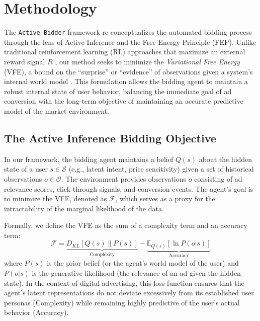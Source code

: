 \section{Methodology}

The \texttt{Active-Bidder} framework re-conceptualizes the automated bidding process through the lens of Active Inference and the Free Energy Principle (FEP). Unlike traditional reinforcement learning (RL) approaches that maximize an external reward signal $R$ \citep{sutton2018reinforcement}, our method seeks to minimize the \textit{Variational Free Energy} (VFE), a bound on the ``surprise'' or ``evidence'' of observations given a system's internal world model \citep{friston2010free}. This formulation allows the bidding agent to maintain a robust internal state of user behavior, balancing the immediate goal of ad conversion with the long-term objective of maintaining an accurate predictive model of the market environment.

\subsection{The Active Inference Bidding Objective}

In our framework, the bidding agent maintains a belief $Q(s)$ about the hidden state of a user $s \in \mathcal{S}$ (e.g., latent intent, price sensitivity) given a set of historical observations $o \in \mathcal{O}$. The environment provides observations $o$ consisting of ad relevance scores, click-through signals, and conversion events. The agent's goal is to minimize the VFE, denoted as $\mathcal{F}$, which serves as a proxy for the intractability of the marginal likelihood of the data.

Formally, we define the VFE as the sum of a complexity term and an accuracy term:
\begin{equation}
\mathcal{F} = \underbrace{D_{KL}\left[Q(s) \parallel P(s)\right]}_{\text{Complexity}} - \underbrace{\mathbb{E}_{Q(s)} \left[\ln P(o|s)\right]}_{\text{Accuracy}}
\end{equation}
where $P(s)$ is the prior belief (or the agent's world model of the user) and $P(o|s)$ is the generative likelihood (the relevance of an ad given the hidden state). In the context of digital advertising, this loss function ensures that the agent's latent representations do not deviate excessively from its established user personas (Complexity) while remaining highly predictive of the user's actual behavior (Accuracy).

